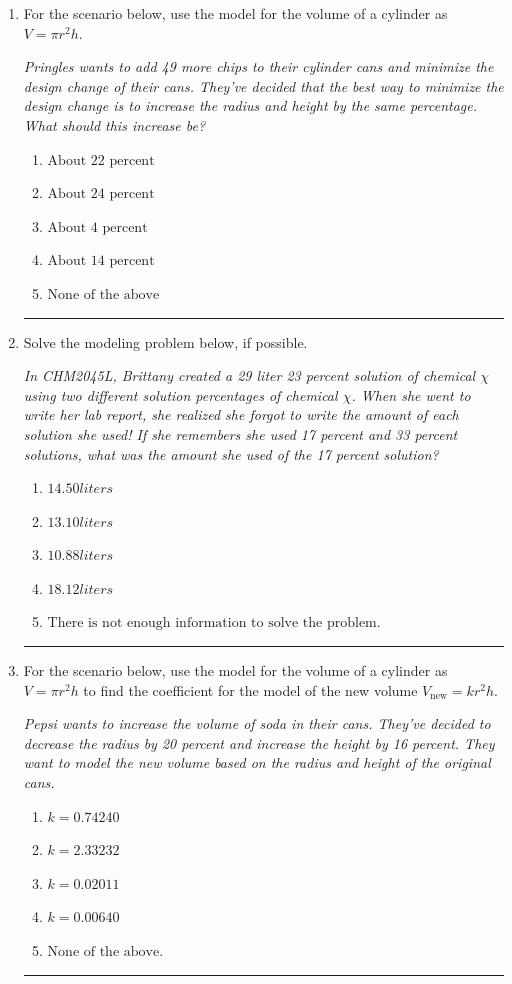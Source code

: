 \documentclass[14pt]{extbook}
\newcommand{\litem}[1]{\item#1\hspace*{-1cm}\rule{\textwidth}{0.4pt}}
\begin{document}
\begin{enumerate}
{\begin{enumerate}[label=\Alph*.]
\end{enumerate} }
\litem{
For the scenario below, use the model for the volume of a cylinder as $V = \pi r^2 h$.
\begin{center}
    \textit{ Pringles wants to add 49 \text{percent} more chips to their cylinder cans and minimize the design change of their cans. They've decided that the best way to minimize the design change is to increase the radius and height by the same percentage. What should this increase be? }
\end{center}
\begin{enumerate}[label=\Alph*.]
\item \( \text{About } 22 \text{ percent} \)
\item \( \text{About } 24 \text{ percent} \)
\item \( \text{About } 4 \text{ percent} \)
\item \( \text{About } 14 \text{ percent} \)
\item \( \text{None of the above} \)

\end{enumerate} }
\litem{
Solve the modeling problem below, if possible.
\begin{center}
    \textit{ In CHM2045L, Brittany created a 29 liter 23 percent solution of chemical $\chi$ using two different solution percentages of chemical $\chi$. When she went to write her lab report, she realized she forgot to write the amount of each solution she used! If she remembers she used 17 percent and 33 percent solutions, what was the amount she used of the 17 percent solution? }
\end{center}
\begin{enumerate}[label=\Alph*.]
\item \( 14.50 liters \)
\item \( 13.10 liters \)
\item \( 10.88 liters \)
\item \( 18.12 liters \)
\item \( \text{There is not enough information to solve the problem.} \)

\end{enumerate} }
\litem{
For the scenario below, use the model for the volume of a cylinder as $V = \pi r^2 h$ to find the coefficient for the model of the new volume $V_{\text{new}} = k r^2 h$.
\begin{center}
    \textit{ Pepsi wants to increase the volume of soda in their cans. They've decided to decrease the radius by 20 percent and increase the height by 16 percent. They want to model the new volume based on the radius and height of the original cans. }
\end{center}
\begin{enumerate}[label=\Alph*.]
\item \( k = 0.74240 \)
\item \( k = 2.33232 \)
\item \( k = 0.02011 \)
\item \( k = 0.00640 \)
\item \( \text{None of the above.} \)


\end{enumerate}}
\end{enumerate}
\end{document}
